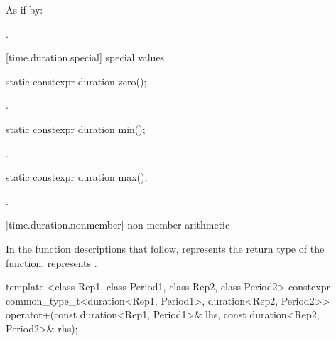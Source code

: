 \begin{itemdescr}
\pnum
\effects As if by: 

\pnum
\returns {}.
\end{itemdescr}


[time.duration.special]{ special values}

%
%
\begin{itemdecl}
static constexpr duration zero();
\end{itemdecl}

\begin{itemdescr}
\pnum
\returns {}.
\end{itemdescr}

%
%
\begin{itemdecl}
static constexpr duration min();
\end{itemdecl}

\begin{itemdescr}
\pnum
\returns {}.
\end{itemdescr}

%
%
\begin{itemdecl}
static constexpr duration max();
\end{itemdecl}

\begin{itemdescr}
\pnum
\returns {}.
\end{itemdescr}

[time.duration.nonmember]{ non-member arithmetic}

\pnum
In the function descriptions that follow,  represents the return type
of the function.  represents .

%
\begin{itemdecl}
template <class Rep1, class Period1, class Rep2, class Period2>
  constexpr common_type_t<duration<Rep1, Period1>, duration<Rep2, Period2>>
  operator+(const duration<Rep1, Period1>& lhs, const duration<Rep2, Period2>& rhs);
\end{itemdecl}

